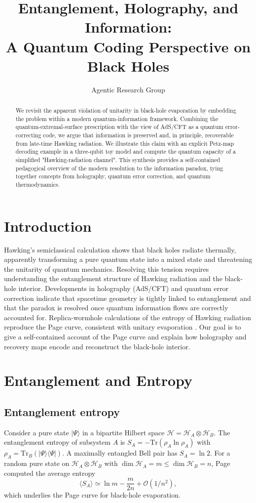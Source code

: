 \documentclass[12pt, numbers, sort&compress]{article}
\title{Entanglement, Holography, and Information: \\ A Quantum Coding Perspective on Black Holes}
\author{Agentic Research Group}
\date{}
\begin{document}
\maketitle

\begin{abstract}
We revisit the apparent violation of unitarity in black-hole evaporation by embedding the problem within a modern quantum-information framework. Combining the quantum-extremal-surface prescription with the view of AdS/CFT as a quantum error-correcting code, we argue that information is preserved and, in principle, recoverable from late-time Hawking radiation. We illustrate this claim with an explicit Petz-map decoding example in a three-qubit toy model and compute the quantum capacity of a simplified "Hawking-radiation channel". This synthesis provides a self-contained pedagogical overview of the modern resolution to the information paradox, tying together concepts from holography, quantum error correction, and quantum thermodynamics.
\end{abstract}

\section{Introduction}
Hawking’s semiclassical calculation shows that black holes radiate thermally, apparently transforming a pure quantum state into a mixed state and threatening the unitarity of quantum mechanics. Resolving this tension requires understanding the entanglement structure of Hawking radiation and the black-hole interior. Developments in holography (AdS/CFT) and quantum error correction indicate that spacetime geometry is tightly linked to entanglement and that the paradox is resolved once quantum information flows are correctly accounted for. Replica-wormhole calculations of the entropy of Hawking radiation reproduce the Page curve, consistent with unitary evaporation \cite{SciPost:2020islands,Penington:2023replica}. Our goal is to give a self-contained account of the Page curve and explain how holography and recovery maps encode and reconstruct the black-hole interior.

\section{Entanglement and Entropy}

\subsection{Entanglement entropy}
Consider a pure state $|\Psi\rangle$ in a bipartite Hilbert space $\mathcal{H} = \mathcal{H}_A \otimes \mathcal{H}_B$. The entanglement entropy of subsystem $A$ is $S_A = -\mathrm{Tr}(\rho_A \ln \rho_A)$ with $\rho_A=\mathrm{Tr}_B(|\Psi\rangle\langle\Psi|)$. A maximally entangled Bell pair has $S_A=\ln 2$. For a random pure state on $\mathcal{H}_A\otimes\mathcal{H}_B$ with $\dim\mathcal{H}_A=m\le \dim\mathcal{H}_B=n$, Page computed the average entropy \cite{Page:1993prl}
\begin{equation}
\langle S_A \rangle \simeq \ln m - \frac{m}{2n} + \mathcal{O}(1/n^2),
\end{equation}
which underlies the Page curve for black-hole evaporation.
\end{document}
